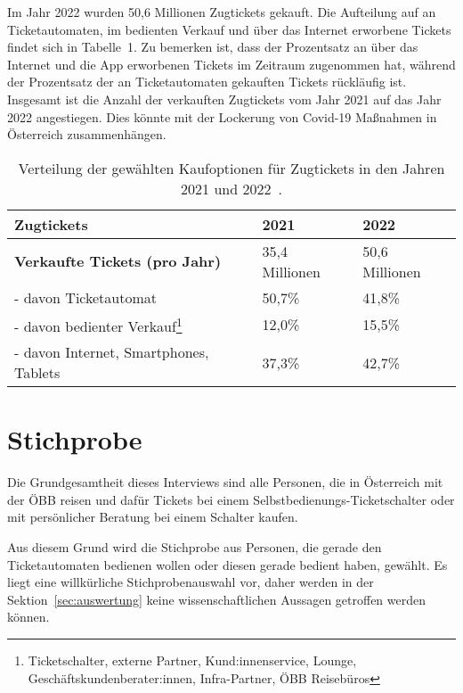 \documentclass[]{article}
\begin{document}
Im Jahr 2022 wurden 50,6 Millionen Zugtickets gekauft. Die Aufteilung auf an Ticketautomaten, im bedienten Verkauf und über das Internet erworbene Tickets findet sich in Tabelle~1. Zu bemerken ist, dass der Prozentsatz an über das Internet und die App erworbenen Tickets im Zeitraum zugenommen hat, während der Prozentsatz der an Ticketautomaten gekauften Tickets rückläufig ist. Insgesamt ist die Anzahl der verkauften Zugtickets vom Jahr 2021 auf das Jahr 2022 angestiegen. Dies könnte mit der Lockerung von Covid-19 Maßnahmen in Österreich zusammenhängen.

\begin{table}
\begin{minipage}{\textwidth}
	\label{tab:zugtickets_aufteilung}
	\centering
	\begin{tabular}{|l|l|l|}
		\hline
		\textbf{Zugtickets} & \textbf{2021} & \textbf{2022} \\
		\hline
		\textbf{Verkaufte Tickets (pro Jahr)} & 35,4 Millionen & 50,6 Millionen \\
		\hline
		- davon Ticketautomat & 50,7\% & 41,8\% \\
		\hline
		- davon bedienter Verkauf\footnote{Ticketschalter, externe Partner, Kund:innenservice, Lounge, Geschäftskundenberater:innen, Infra-Partner, ÖBB Reisebüros} & 12,0\% & 15,5\% \\
		\hline
		- davon Internet, Smartphones, Tablets & 37,3\% & 42,7\% \\
		\hline
	\end{tabular}
\end{minipage}
	\caption{Verteilung der gewählten Kaufoptionen für Zugtickets in den Jahren 2021 und 2022~\cite{oebb_zahlendatenfakten202223}.}
\end{table}




\section{Stichprobe}
Die Grundgesamtheit dieses Interviews sind alle Personen, die in Österreich mit der ÖBB reisen und dafür Tickets bei einem Selbstbedienungs-Ticketschalter oder mit persönlicher Beratung bei einem Schalter kaufen.

Aus diesem Grund wird die Stichprobe aus Personen, die gerade den Ticketautomaten bedienen wollen oder diesen gerade bedient haben, gewählt. Es liegt eine willkürliche Stichprobenauswahl vor, daher werden in der Sektion~\ref{sec:auswertung} keine wissenschaftlichen Aussagen getroffen werden können.
\end{document}
